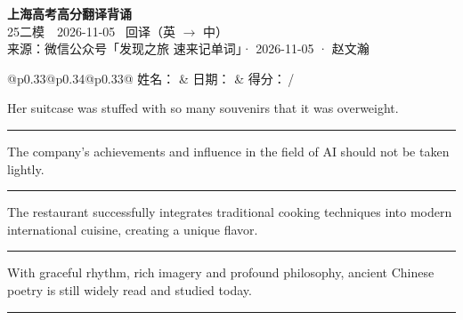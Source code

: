 \documentclass[11pt,a4paper]{article}
\newcommand{\num}[1]{\makebox[1.9em][r]{#1.}\hspace{0.3em}}
\newcommand{\wline}{\noindent\rule{\linewidth}{0.4pt}}
\begin{document}
\pagestyle{plain}
\begin{center}
{\LARGE\bfseries 上海高考高分翻译背诵 }\\[0.25em]
{\large 25二模　2026-11-05 \quad\ 回译（英 $\to$ 中）}\\[0.35em]
{\footnotesize 来源：微信公众号「发现之旅 速来记单词」· 2026-11-05 · 赵文瀚}
\end{center}

\vspace{0.4em}
\noindent\begin{tabular}{@{}p{0.33\textwidth}@{}p{0.34\textwidth}@{}p{0.33\textwidth}@{}}
姓名：\underline{\hspace{2.0cm}} & 日期：\underline{\hspace{2.0cm}} & 得分：\underline{\hspace{1.4cm}}\,/ \\
\end{tabular}

\vspace{0.5em}

\vspace{0.8em}
\num{1}Her suitcase was stuffed with so many souvenirs that it was overweight.

\vspace{0.25em}

\wline

\num{2}The company’s achievements and influence in the field of AI should not be taken lightly.

\vspace{0.25em}

\wline

\num{3}The restaurant successfully integrates traditional cooking techniques into modern international cuisine, creating a unique flavor.

\vspace{0.25em}

\wline

\num{4}With graceful rhythm, rich imagery and profound philosophy, ancient Chinese poetry is still widely read and studied today.

\vspace{0.25em}

\wline
\end{document}
